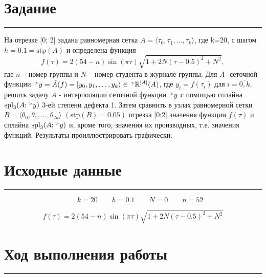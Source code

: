 \documentclass[a4paper, 14pt]{extarticle}
\begin{document}


\section*{Задание}\vspace{-20pt}\rule{\linewidth}{0.1mm}

На отрезке [0; 2] задана равномерная сетка $A = \langle \tau_0, \tau_1, \dots, \tau_k \rangle$, 
где k=20, с шагом $h = 0.1 = \text{stp}(A)$ и определена функция 
\begin{equation*}
    f(\tau) = 2 (54 - n) \sin(\pi \tau) \sqrt{1 + 2 N (\tau - 0.5)^2 + N^2},
\end{equation*}
где $n$ – номер группы и $N$ – номер студента в журнале группы. Для $A$ -сеточной функции
$\upgt y = \hat{A} (f) = \left[ y_0, y_1, \dots, y_k \right\rangle \in \upgt \mathbb{R}^{|A|}(A)$,
где $y_i = f(\tau_i)$ для $i = \overline{0, k}$, решить задачу $A$ -
интерполяции сеточной функции $\upgt y$ с помощью сплайна $\text{spl}_3(A; \upgt y)$
3-ей степени дефекта 1. Затем сравнить в узлах равномерной сетки 
$B = \langle \theta_0, \theta_1, \dots, \theta_{2k} \rangle$ $(\text{stp}(B)=0.05)$ 
отрезка [0;2] значения функции $f(\tau)$ и сплайна $\text{spl}_3(A; \upgt y)$ и, 
кроме того, значения их производных, т.е. значения функций. Результаты 
проиллюстрировать графически.

\section*{Исходные данные}\vspace{-20pt}\rule{\linewidth}{0.1mm}

\begin{equation*}
    [0; 2] \qquad k=20 \qquad h=0.1 \qquad N = 0 \qquad n=52
\end{equation*}

\begin{equation*}
    f(\tau) = 2 (54 - n) \sin(\pi \tau) \sqrt{1 + 2 N (\tau - 0.5)^2 + N^2}
\end{equation*}

\section*{{Ход выполнения работы}}\vspace{-20pt}\rule{\linewidth}{0.1mm}
\end{document}
